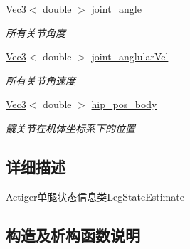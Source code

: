 \begin{DoxyCompactItemize}
\mbox{\label{classquadruped_1_1LegStateEstimate_a8bfbd35bd4ee16e05dc01a62e5e05650}} 
\hyperlink{cppTypes_8h_a65c27bf97693676535dd0b30ea0ad399}{Vec3}$<$ double $>$ \hyperlink{classquadruped_1_1LegStateEstimate_a8bfbd35bd4ee16e05dc01a62e5e05650}{joint\+\_\+angle}
\begin{DoxyCompactList}\small\item\em 所有关节角度 \end{DoxyCompactList}\item 
\mbox{\label{classquadruped_1_1LegStateEstimate_a595e8e970d727fe1bbdfd78bda4207e5}} 
\hyperlink{cppTypes_8h_a65c27bf97693676535dd0b30ea0ad399}{Vec3}$<$ double $>$ \hyperlink{classquadruped_1_1LegStateEstimate_a595e8e970d727fe1bbdfd78bda4207e5}{joint\+\_\+anglular\+Vel}
\begin{DoxyCompactList}\small\item\em 所有关节角速度 \end{DoxyCompactList}\item 
\mbox{\label{classquadruped_1_1LegStateEstimate_a2c25cea6340a9ce2183684979dc0c58e}} 
\hyperlink{cppTypes_8h_a65c27bf97693676535dd0b30ea0ad399}{Vec3}$<$ double $>$ \hyperlink{classquadruped_1_1LegStateEstimate_a2c25cea6340a9ce2183684979dc0c58e}{hip\+\_\+pos\+\_\+body}
\begin{DoxyCompactList}\small\item\em 髋关节在机体坐标系下的位置 \end{DoxyCompactList}\end{DoxyCompactItemize}


\subsection{详细描述}
Actiger单腿状态信息类\+Leg\+State\+Estimate 

\subsection{构造及析构函数说明}
\mbox{\label{classquadruped_1_1LegStateEstimate_ab66c4db78288cf0c25d4c2477e8c0a7b}} 
